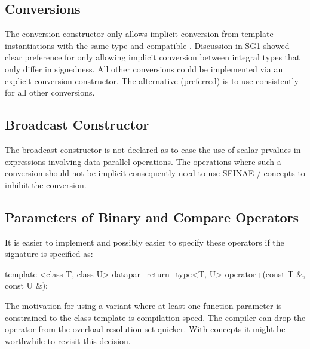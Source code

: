 \subsection{Conversions}
The \datapar conversion constructor only allows implicit conversion from \datapar template instantiations with the same  type and compatible .
Discussion in SG1 showed clear preference for only allowing implicit conversion between integral types that only differ in signedness.
All other conversions could be implemented via an explicit conversion constructor.
The alternative (preferred) is to use \simdcast consistently for all other conversions.

\subsection{Broadcast Constructor}
The broadcast constructor is not declared as  to ease the use of scalar prvalues in expressions involving data-parallel operations.
The operations where such a conversion should not be implicit consequently need to use SFINAE / concepts to inhibit the conversion.

\subsection{Parameters of Binary and Compare Operators}
It is easier to implement and possibly easier to specify these operators if the signature is specified as:
\begin{itemdecl}
template <class T, class U>
datapar_return_type<T, U> operator+(const T &, const U &);
\end{itemdecl}
The motivation for using a variant where at least one function parameter is constrained to the \datapar class template is compilation speed.
The compiler can drop the operator from the overload resolution set quicker.
With concepts it might be worthwhile to revisit this decision.

